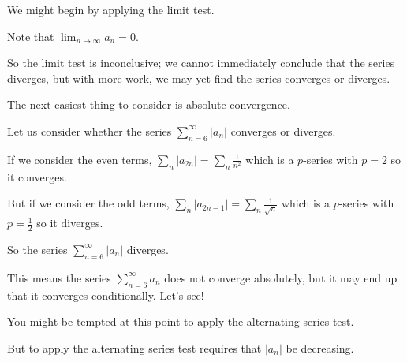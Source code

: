 \documentclass{ximera}
\begin{document}
\begin{question}
  \begin{solution}
    \begin{hint}
      We might begin by applying the limit test.
    \end{hint}
    \begin{hint}
      Note that \(\lim_{n \to \infty} a_{n} = 0\).
    \end{hint}
    \begin{hint}
      So the limit test is inconclusive; we cannot immediately conclude that the series diverges, but with more work, we may yet find the series converges or diverges.
    \end{hint}
    \begin{hint}
      The next easiest thing to consider is absolute convergence.
    \end{hint}
    \begin{hint}
      Let us consider whether the series \(\displaystyle\sum_{n=6}^\infty \left| a_{n} \right| \) converges or diverges.
    \end{hint}
    \begin{hint}
      If we consider the even terms, \(\displaystyle\sum_{n} \left| a_{2n} \right|  = \displaystyle\sum_{n} \displaystyle\frac{1}{n^{2}} \) which is a \(p\)-series with \(p = 2\) so it converges.
    \end{hint}
    \begin{hint}
      But if we consider the odd terms, \(\displaystyle\sum_{n} \left| a_{2n-1} \right|  = \displaystyle\sum_{n} \displaystyle\frac{1}{\sqrt{n}} \) which is a \(p\)-series with \(p = \displaystyle\frac{1}{2}\) so it diverges.
    \end{hint}
    \begin{hint}
      So the series \(\displaystyle\sum_{n=6}^\infty \left| a_{n} \right| \) diverges.
    \end{hint}
    \begin{hint}
      This means the series \(\displaystyle\sum_{n=6}^\infty a_{n} \) does not converge absolutely, but it may end up that it converges conditionally.  Let's see!
    \end{hint}
    \begin{hint}
      You might be tempted at this point to apply the alternating series test.
    \end{hint}
    \begin{hint}
      But to apply the alternating series test requires that \(|a_{n}|\) be decreasing.
    \end{hint}
    \begin{hint}

\end{hint}
\end{solution}
\end{question}
\end{document}
